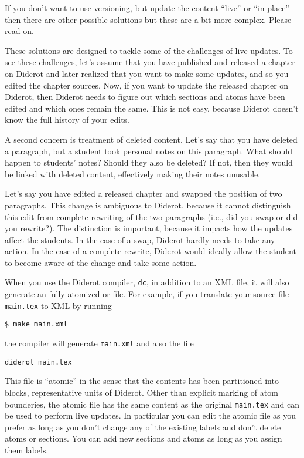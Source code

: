 \begin{flex}
\begin{gram}
If you don't want to use versioning, but update the content ``live'' or ``in place'' then there are other possible solutions but these are a bit more complex.  Please read on.

These solutions are designed to tackle some of the challenges of
live-updates.  
%
To see these challenges, 
%
let's assume that you have published and released a chapter on Diderot and later realized that you want to make some updates, and so you edited the chapter sources.
%
Now, if you want to update the released chapter on Diderot, then
Diderot needs to figure out which sections and atoms have been edited
and which ones remain the same.  
%
This is not easy, because Diderot doesn't know the full history of your edits.

%
A second concern is treatment of deleted content.  Let's say that you have deleted a paragraph, but a student took personal notes on this paragraph.  What should happen to students' notes?
%
Should they also be deleted? 
%
If not,  then they would be linked with deleted content, effectively making their notes unusable.  
\end{gram}

\begin{example}
Let's say you have edited a released chapter and swapped the position of two paragraphs.
%
This change is  ambiguous to Diderot, because it cannot
distinguish this edit from complete rewriting of the two paragraphs
(i.e., did you swap or did you rewrite?).
%
The distinction is important, because it impacts how the updates affect the students.
%
In the case of a swap, Diderot hardly needs to take any action.
%
In the case of a complete rewrite, Diderot would ideally allow the student to become aware of the change and take some action.
\end{example}
\end{flex}

\begin{gram}
\label{grm:publisg::diderot-atomic}
When you use the Diderot compiler, \lstinline`dc`, in addition to an XML file, it will also generate an fully atomized or  file.  For example, if you translate your source file \lstinline`main.tex` to XML by running

\lstinline`$ make main.xml`

the compiler will generate \lstinline`main.xml` and also the file 

\lstinline`diderot_main.tex`

This file is ``atomic'' in the sense that the contents has been partitioned into  blocks, representative units of Diderot.
%
Other than explicit marking of atom bounderies, the atomic file has the same content as the original \lstinline`main.tex`
%
and can be used to perform live updates. 
%
In particular you can edit the atomic file as you prefer as long as you don't change any of the existing labels and don't delete atoms or sections.  You can add new sections and atoms as long as you assign them labels.
 
\end{gram}


